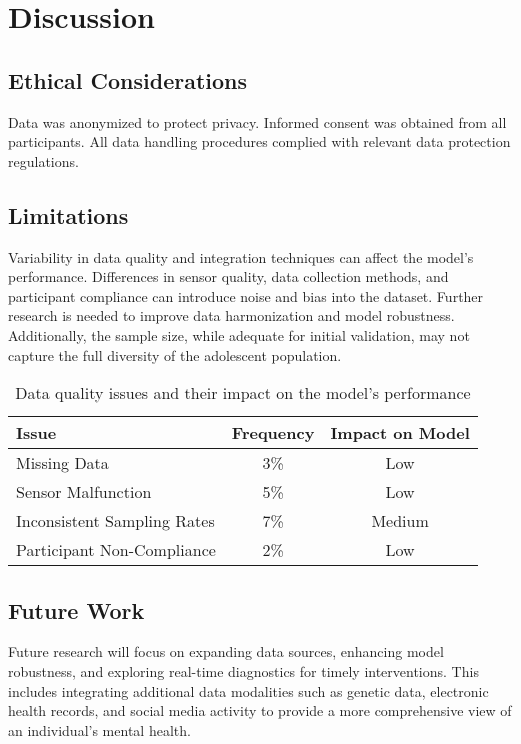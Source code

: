 \documentclass{article}
\begin{document}
\section{Discussion}
\subsection{Ethical Considerations}
Data was anonymized to protect privacy. Informed consent was obtained from all participants. All data handling procedures complied with relevant data protection regulations.

\subsection{Limitations}
Variability in data quality and integration techniques can affect the model's performance. Differences in sensor quality, data collection methods, and participant compliance can introduce noise and bias into the dataset. Further research is needed to improve data harmonization and model robustness. Additionally, the sample size, while adequate for initial validation, may not capture the full diversity of the adolescent population.

\begin{table}[h]
    \centering
    \caption{Data quality issues and their impact on the model's performance}
    \label{tab:data_quality}
    \vspace{0.3cm}
    \begin{tabular}{|l|c|c|}
    \hline
    \textbf{Issue} & \textbf{Frequency} & \textbf{Impact on Model} \\
    \hline
    Missing Data & 3\% & Low \\
    Sensor Malfunction & 5\% & Low \\
    Inconsistent Sampling Rates & 7\% & Medium \\
    Participant Non-Compliance & 2\% & Low \\
    \hline
    \end{tabular}
    \end{table}    

\subsection{Future Work}
Future research will focus on expanding data sources, enhancing model robustness, and exploring real-time diagnostics for timely interventions. This includes integrating additional data modalities such as genetic data, electronic health records, and social media activity to provide a more comprehensive view of an individual's mental health.
\end{document}
